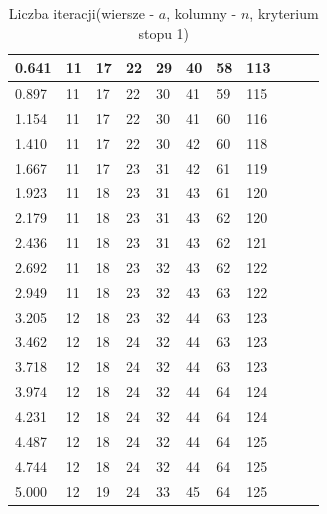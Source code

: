 \documentclass{article}
\begin{document}
\begin{table}[H]
\begin{tabular}{|l|l|l|l|l|l|l|l|l|l|l|}
0.641 & 11 & 17 & 22 & 29 & 40 & 58 & 113 \\ \hline
0.897 & 11 & 17 & 22 & 30 & 41 & 59 & 115 \\ \hline
1.154 & 11 & 17 & 22 & 30 & 41 & 60 & 116 \\ \hline
1.410 & 11 & 17 & 22 & 30 & 42 & 60 & 118 \\ \hline
1.667 & 11 & 17 & 23 & 31 & 42 & 61 & 119 \\ \hline
1.923 & 11 & 18 & 23 & 31 & 43 & 61 & 120 \\ \hline
2.179 & 11 & 18 & 23 & 31 & 43 & 62 & 120 \\ \hline
2.436 & 11 & 18 & 23 & 31 & 43 & 62 & 121 \\ \hline
2.692 & 11 & 18 & 23 & 32 & 43 & 62 & 122 \\ \hline
2.949 & 11 & 18 & 23 & 32 & 43 & 63 & 122 \\ \hline
3.205 & 12 & 18 & 23 & 32 & 44 & 63 & 123 \\ \hline
3.462 & 12 & 18 & 24 & 32 & 44 & 63 & 123 \\ \hline
3.718 & 12 & 18 & 24 & 32 & 44 & 63 & 123 \\ \hline
3.974 & 12 & 18 & 24 & 32 & 44 & 64 & 124 \\ \hline
4.231 & 12 & 18 & 24 & 32 & 44 & 64 & 124 \\ \hline
4.487 & 12 & 18 & 24 & 32 & 44 & 64 & 125 \\ \hline
4.744 & 12 & 18 & 24 & 32 & 44 & 64 & 125 \\ \hline
5.000 & 12 & 19 & 24 & 33 & 45 & 64 & 125 \\ \hline
\end{tabular}
\caption{Liczba iteracji(wiersze - $a$, kolumny - $n$, kryterium stopu 1)}
\end{table}
\end{document}
